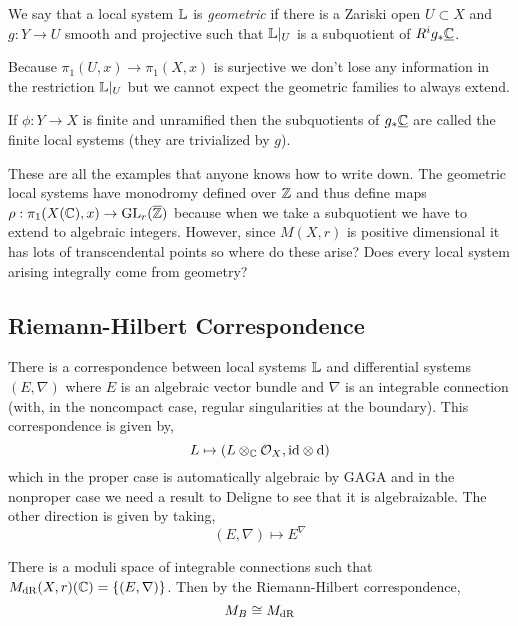 \documentclass[12pt]{article}
\begin{document}
\begin{defn}
We say that a local system $\mathbb{L}$ is \textit{geometric} if there is a Zariski open $U \subset X$ and $g : Y \to U$ smooth and projective such that $\mathbb{L}|_U$ is a subquotient of $R^i g_* \underline{\mathbb{C}}$.
\end{defn}

\begin{rmk}
Because $\pi_1(U, x) \to \pi_1(X, x)$ is surjective we don't lose any information in the restriction $\mathbb{L}|_U$ but we cannot expect the geometric families to always extend. 
\end{rmk}

\begin{rmk}
If $\phi  : Y \to X$ is finite and unramified then the subquotients of $g_* \underline{\mathbb{C}}$ are called the finite local systems (they are trivialized by $g$). 
\end{rmk}

These are all the examples that anyone knows how to write down. The geometric local systems have monodromy defined over $\mathbb{Z}$ and thus define maps $\rho : \pi_1(X(\mathbb{C}), x) \to \mathrm{GL}_r(\overline{\mathbb{Z}})$ because when we take a subquotient we have to extend to algebraic integers. However, since $M(X, r)$ is positive dimensional it has lots of transcendental points so where do these arise? Does every local system arising integrally come from geometry? 

\subsection{Riemann-Hilbert Correspondence}

There is a correspondence between local systems $\mathbb{L}$ and differential systems $(E, \nabla)$ where $E$ is an algebraic vector bundle and $\nabla$ is an integrable connection (with, in the noncompact case, regular singularities at the boundary). This correspondence is given by,
\[ L \mapsto (L \otimes_{\mathbb{C}} \mathcal{O}_{X}, \mathrm{id} \otimes \mathrm{d}{}) \]
which in the proper case is automatically algebraic by GAGA and in the nonproper case we need a result to Deligne to see that it is algebraizable. The other direction is given by taking,
\[ (E, \nabla) \mapsto E^{\nabla} \]

\begin{prop}
There is a moduli space of integrable connections such that $M_{\mathrm{dR}}(X, r)(\mathbb{C}) = \{ (E, \nabla) \} $. Then by the Riemann-Hilbert correspondence, \[ M_B \cong M_{\mathrm{dR}} \]
\end{prop}
\end{document}
